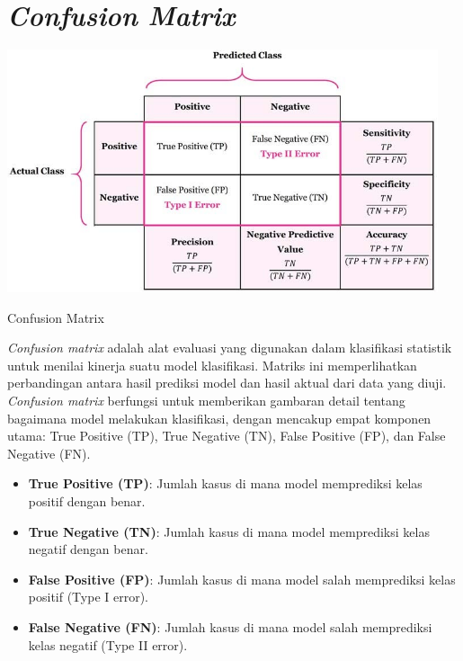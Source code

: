 \section{\textit{Confusion Matrix}}
\begin{afigure}
    \includegraphics[width=0.95\textwidth, center]{images/contoh-confusion-matrix.jpg}
    \caption{Confusion Matrix}
    \label{fig:contoh-confusion-matrix} 
\end{afigure}
\textit{Confusion matrix} adalah alat evaluasi yang digunakan dalam klasifikasi statistik untuk menilai kinerja suatu model klasifikasi. Matriks ini memperlihatkan perbandingan antara hasil prediksi model dan hasil aktual dari data yang diuji. \textit{Confusion matrix} berfungsi untuk memberikan gambaran detail tentang bagaimana model melakukan klasifikasi, dengan mencakup empat komponen utama: True Positive (TP), True Negative (TN), False Positive (FP), dan False Negative (FN).

\begin{itemize}
    \item \textbf{True Positive (TP)}: Jumlah kasus di mana model memprediksi kelas positif dengan benar.
    \item \textbf{True Negative (TN)}: Jumlah kasus di mana model memprediksi kelas negatif dengan benar.
    \item \textbf{False Positive (FP)}: Jumlah kasus di mana model salah memprediksi kelas positif (Type I error).
    \item \textbf{False Negative (FN)}: Jumlah kasus di mana model salah memprediksi kelas negatif (Type II error).
\end{itemize}

